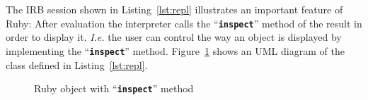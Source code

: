 \documentclass[10pt,journal,compsoc]{joser13}
\newcommand{\code}[1]{``\texttt{\textbf{\textcolor{codegray}{\small{#1}}}}''}
\newcommand{\fig}[1]{Figure~\ref{fig:#1}}
\newcommand{\lst}[1]{Listing~\ref{lst:#1}}
\begin{document}
The \ac{IRB} session shown in \lst{repl} illustrates an important feature of Ruby: After evaluation the interpreter calls the \code{inspect} method of the result in order to display it. \emph{I.e.} the user can control the way an object is displayed by implementing the \code{inspect} method. \fig{object} shows an UML diagram of the class defined in \lst{repl}.
\begin{figure}[htbp]
  \begin{center}
    \caption{Ruby object with \code{inspect} method\label{fig:object}}
  \end{center}
\end{figure}









\end{document}
